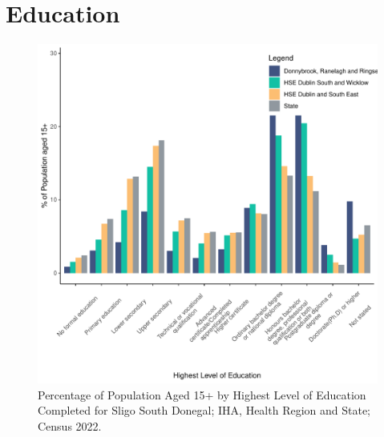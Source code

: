 \documentclass{article}
\begin{document}
\section{Education}\label{sect:Edu}
\begin{figure}[H]
	\centering
	\includegraphics[width = 120mm]{../figures/EduED.pdf}
	\caption{Percentage of Population Aged 15+ by Highest Level of Education Completed for Sligo South Donegal; IHA, Health Region and State; Census 2022.}
	\label{fig:vbnv}
	\end{figure}
\end{document}
